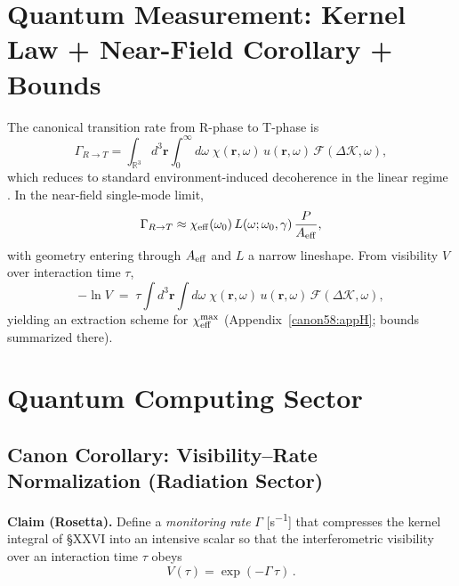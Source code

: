 \documentclass[10pt,reprint,aps,onecolumn,nofootinbib]{revtex4-2}
\begin{document}
    \section{Quantum Measurement: Kernel Law + Near-Field Corollary + Bounds}\label{canon58:measurement}
    The canonical transition rate from R-phase to T-phase is
    \begin{equation}
        \Gamma_{R\to T}
        =\int_{\mathbb{R}^3}\! d^3\mathbf r \int_{0}^{\infty}\! d\omega\;
        \chi(\mathbf r,\omega)\,u(\mathbf r,\omega)\,\mathcal F(\Delta\mathcal K,\omega),
        \label{eq:kernel}
    \end{equation}
    which reduces to standard environment-induced decoherence in the linear regime \cite{Zurek2003}.
    In the near-field single-mode limit,
    \[
        \Gamma_{R\to T}\approx \chi_{\rm eff}(\omega_0)\,L(\omega;\omega_0,\gamma)\,\frac{P}{A_{\rm eff}},
    \]
    with geometry entering through $A_{\rm eff}$ and $L$ a narrow lineshape. From visibility $V$ over interaction time $\tau$,
    \[
        -\ln V \;=\; \tau \int d^3\mathbf r \int d\omega\;\chi(\mathbf r,\omega)\,u(\mathbf r,\omega)\,\mathcal F(\Delta\mathcal K,\omega),
    \]
    yielding an extraction scheme for $\chi_{\rm eff}^{\max}$ (Appendix~\ref{canon58:appH}; bounds summarized there). %


    \section{Quantum Computing Sector}
    \subsection*{Canon Corollary: Visibility–Rate Normalization (Radiation Sector)}

        \textbf{Claim (Rosetta).}
        Define a \emph{monitoring rate} $\Gamma$ [\si{s^{-1}}] that compresses the kernel integral of §XXVI into an intensive scalar so that the interferometric visibility over an interaction time $\tau$ obeys
        \[
            V(\tau)=\exp(-\Gamma\,\tau)\,.
        \]
\end{document}
